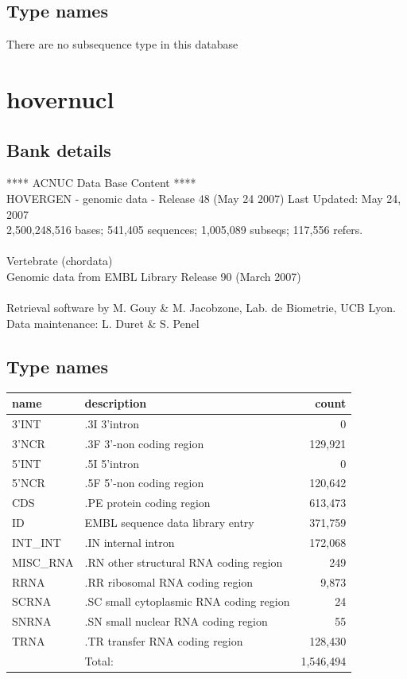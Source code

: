 \documentclass{article}
\begin{document}
\begin{Schunk}
\subsection{Type names}
There are no subsequence type in this database
\section{ hovernucl }
\subsection{Bank details}
               ****     ACNUC Data Base Content      ****                      \\
 HOVERGEN - genomic data - Release 48 (May 24 2007) Last Updated: May 24, 2007\\
2,500,248,516 bases; 541,405 sequences; 1,005,089 subseqs; 117,556 refers.\\
                                                                               \\
                       Vertebrate (chordata)\\
    Genomic data from EMBL Library Release 90 (March 2007)\\
\\
Retrieval software by M. Gouy \& M. Jacobzone, Lab. de Biometrie, UCB Lyon.\\
Data maintenance: L. Duret \& S. Penel\\


\subsection{Type names}
\noindent\begin{tabular}{llr}
\hline \hline
name & description & count \\
\hline
3'INT  &  .3I 3'intron  &  0 \\
3'NCR  &  .3F  3'-non coding region  &  129,921 \\
5'INT  &  .5I 5'intron  &  0 \\
5'NCR  &  .5F  5'-non coding region  &  120,642 \\
CDS  &  .PE protein coding region  &  613,473 \\
ID  &  EMBL sequence data library entry  &  371,759 \\
INT\_INT  &  .IN  internal intron  &  172,068 \\
MISC\_RNA  &  .RN other structural RNA coding region  &  249 \\
RRNA  &  .RR ribosomal RNA coding region  &  9,873 \\
SCRNA  &  .SC small cytoplasmic RNA coding region  &  24 \\
SNRNA  &  .SN small nuclear RNA coding region  &  55 \\
TRNA  &  .TR transfer RNA coding region  &  128,430 \\
\hline
 & Total: & 1,546,494 \\
\hline \hline
\end{tabular}


\end{Schunk}
\end{document}
